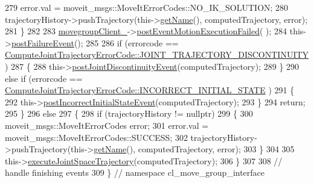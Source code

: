 \begin{DoxyCode}
279                 error.val = moveit\_msgs::MoveItErrorCodes::NO\_IK\_SOLUTION;
280                 trajectoryHistory->pushTrajectory(this->\hyperlink{classsmacc_1_1ISmaccClientBehavior_a18e4bec9460b010f2894c0f7e7064a34}{getName}(), computedTrajectory, error);
281             \}
282 
283             \hyperlink{classcl__move__group__interface_1_1CbMoveEndEffectorTrajectory_aea650d3e7836125b32be97392b71a7f3}{movegroupClient\_}->\hyperlink{classcl__move__group__interface_1_1ClMoveGroup_a39dc3871d29b2af1ab739057f6ca6daa}{postEventMotionExecutionFailed}(
      );
284             this->\hyperlink{classsmacc_1_1SmaccAsyncClientBehavior_af6fa358cb1ab5ed16791a201f59260e0}{postFailureEvent}();
285 
286             \textcolor{keywordflow}{if} (errorcode == 
      \hyperlink{namespacecl__move__group__interface_ae5fc1caf9a16ae5ad1c97c2e137a7017a3e86842785cd7c42003e516418347c8e}{ComputeJointTrajectoryErrorCode::JOINT\_TRAJECTORY\_DISCONTINUITY}
      )
287             \{
288                 this->\hyperlink{classcl__move__group__interface_1_1CbMoveEndEffectorTrajectory_a308331beab9b2ec0eae72fa56fa999c9}{postJointDiscontinuityEvent}(computedTrajectory);
289             \}
290             \textcolor{keywordflow}{else} \textcolor{keywordflow}{if} (errorcode == 
      \hyperlink{namespacecl__move__group__interface_ae5fc1caf9a16ae5ad1c97c2e137a7017a1b748367c8d468cb9b65ecd6b2eab32c}{ComputeJointTrajectoryErrorCode::INCORRECT\_INITIAL\_STATE}
      )
291             \{
292                 this->\hyperlink{classcl__move__group__interface_1_1CbMoveEndEffectorTrajectory_a6180230347c922fa0d85f514ce5029df}{postIncorrectInitialStateEvent}(computedTrajectory);
293             \}
294             \textcolor{keywordflow}{return};
295         \}
296         \textcolor{keywordflow}{else}
297         \{
298             \textcolor{keywordflow}{if} (trajectoryHistory != \textcolor{keyword}{nullptr})
299             \{
300                 moveit\_msgs::MoveItErrorCodes error;
301                 error.val = moveit\_msgs::MoveItErrorCodes::SUCCESS;
302                 trajectoryHistory->pushTrajectory(this->\hyperlink{classsmacc_1_1ISmaccClientBehavior_a18e4bec9460b010f2894c0f7e7064a34}{getName}(), computedTrajectory, error);
303             \}
304 
305             this->\hyperlink{classcl__move__group__interface_1_1CbMoveEndEffectorTrajectory_a3a75fa185c62591e1869427650338a32}{executeJointSpaceTrajectory}(computedTrajectory);
306         \}
307 
308         \textcolor{comment}{// handle finishing events}
309     \} \textcolor{comment}{// namespace cl\_move\_group\_interface}
\end{DoxyCode}
